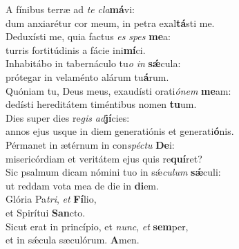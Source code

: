 \evenverse A fínibus terræ ad \textit{te} \textit{cla}\textbf{má}vi:~\*\\
\evenverse dum anxiarétur cor meum, in petra exal\textbf{tá}sti me.\\
\oddverse Deduxísti me, quia factus \textit{es} \textit{spes} \textbf{me}a:~\*\\
\oddverse turris fortitúdinis a fácie ini\textbf{mí}ci.\\
\evenverse Inhabitábo in tabernáculo tu\textit{o} \textit{in} \textbf{sǽ}cula:~\*\\
\evenverse prótegar in velaménto alárum tu\textbf{á}rum.\\
\oddverse Quóniam tu, Deus meus, exaudísti orati\textit{ó}\textit{nem} \textbf{me}am:~\*\\
\oddverse dedísti hereditátem timéntibus nomen \textbf{tu}um.\\
\evenverse Dies super dies re\textit{gis} \textit{ad}\textbf{jí}cies:~\*\\
\evenverse annos ejus usque in diem generatiónis et generati\textbf{ó}nis.\\
\oddverse Pérmanet in ætérnum in con\textit{spé}\textit{ctu} \textbf{De}i:~\*\\
\oddverse misericórdiam et veritátem ejus quis re\textbf{quí}ret?\\
\evenverse Sic psalmum dicam nómini tuo in sǽ\textit{cu}\textit{lum} \textbf{sǽ}culi:~\*\\
\evenverse ut reddam vota mea de die in \textbf{di}em.\\
\oddverse Glória Pa\textit{tri}, \textit{et} \textbf{Fí}lio,~\*\\
\oddverse et Spirítui \textbf{San}cto.\\
\evenverse Sicut erat in princípio, et \textit{nunc}, \textit{et} \textbf{sem}per,~\*\\
\evenverse et in sǽcula sæculórum. \textbf{A}men.\\
